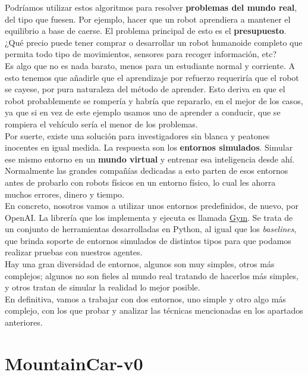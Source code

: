 \documentclass[11pt,fleqn]{book} %
\begin{document}
Podríamos utilizar estos algoritmos para resolver \textbf{problemas del mundo real}, del tipo que fuesen. Por ejemplo, hacer que un robot aprendiera a mantener el equilibrio a base de caerse. El problema principal de esto es el \textbf{presupuesto}. ¿Qué precio puede tener comprar o desarrollar un robot humanoide completo que permita todo tipo de movimientos, sensores para recoger información, etc? \\

Es algo que no es nada barato, menos para un estudiante normal y corriente. A esto tenemos que añadirle que el aprendizaje por refuerzo requeriría que el robot se cayese, por pura naturaleza del método de aprender. Esto deriva en que el robot probablemente se rompería y habría que repararlo, en el mejor de los casos, ya que si en vez de este ejemplo usamos uno de aprender a conducir, que se rompiera el vehículo sería el menor de los problemas. \\

Por suerte, existe una solución para investigadores sin blanca y peatones inocentes en igual medida. La respuesta son los \textbf{entornos simulados}. Simular ese mismo entorno en un \textbf{mundo virtual} y entrenar esa inteligencia desde ahí. Normalmente las grandes compañías dedicadas a esto parten de esos entornos antes de probarlo con robots físicos en un entorno físico, lo cual les ahorra muchos errores, dinero y tiempo. \\

En concreto, nosotros vamos a utilizar unos entornos predefinidos, de nuevo, por OpenAI. La librería que los implementa y ejecuta es llamada \href{https://gym.openai.com/}{Gym}. Se trata de un conjunto de herramientas desarrolladas en Python, al igual que los \textit{baselines}, que brinda soporte de entornos simulados de distintos tipos para que podamos realizar pruebas con nuestros agentes. \\

Hay una gran diversidad de entornos, algunos son muy simples, otros más complejos; algunos no son fieles al mundo real tratando de hacerlos más simples, y otros tratan de simular la realidad lo mejor posible. \\

En definitiva, vamos a trabajar con dos entornos, uno simple y otro algo más complejo, con los que probar y analizar las técnicas mencionadas en los apartados anteriores. \cite{article:gym} \cite{article:entornos}

\section{MountainCar-v0}\label{sec:mountaincar}
\end{document}
